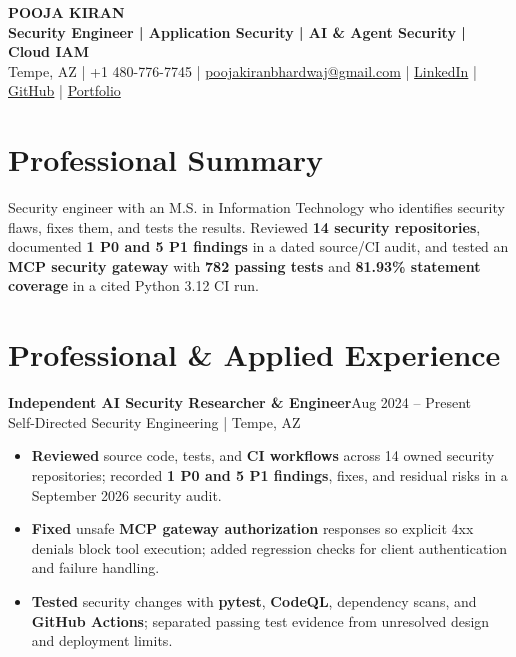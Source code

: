 \documentclass[letterpaper,10pt]{article}
\newcommand{\job}[3]{\textbf{#1}\hfill{\fontsize{10.8}{12.6}\selectfont #2}\\{\fontsize{10.5}{12.4}\selectfont #3}\vspace{2pt}}
\begin{document}
\fontsize{11.6}{14.1}\selectfont
\begin{center}
{\fontsize{23}{26}\selectfont\textbf{POOJA KIRAN}}\\[1pt]
{\fontsize{11.3}{13}\selectfont\textbf{Security Engineer | Application Security | AI \& Agent Security | Cloud IAM}}\\[2pt]
{\fontsize{10.1}{12.1}\selectfont Tempe, AZ | +1 480-776-7745 | \href{mailto:poojakiranbhardwaj@gmail.com}{poojakiranbhardwaj@gmail.com} | \href{https://www.linkedin.com/in/poojakiran}{LinkedIn} | \href{https://github.com/poojakira}{GitHub} | \href{https://poojakira.github.io/Pooja_Kiran_Portfolio_Website/}{Portfolio}}
\end{center}\vspace{-3pt}

\section{Professional Summary}
Security engineer with an M.S. in Information Technology who identifies security flaws, fixes them, and tests the results. Reviewed \textbf{14 security repositories}, documented \textbf{1 P0 and 5 P1 findings} in a dated source/CI audit, and tested an \textbf{MCP security gateway} with \textbf{782 passing tests} and \textbf{81.93\% statement coverage} in a cited Python 3.12 CI run.

\section{Professional \& Applied Experience}
\job{Independent AI Security Researcher \& Engineer}{Aug 2024 -- Present}{Self-Directed Security Engineering | Tempe, AZ}
\begin{itemize}
\item \textbf{Reviewed} source code, tests, and \textbf{CI workflows} across 14 owned security repositories; recorded \textbf{1 P0 and 5 P1 findings}, fixes, and residual risks in a September 2026 security audit.
\item \textbf{Fixed} unsafe \textbf{MCP gateway authorization} responses so explicit 4xx denials block tool execution; added regression checks for client authentication and failure handling.
\item \textbf{Tested} security changes with \textbf{pytest}, \textbf{CodeQL}, dependency scans, and \textbf{GitHub Actions}; separated passing test evidence from unresolved design and deployment limits.
\end{itemize}
\end{document}
